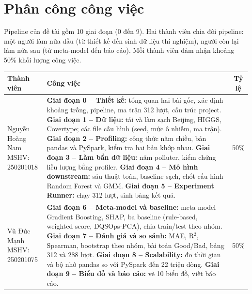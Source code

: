 \section*{Phân công công việc}

Pipeline của đề tài gồm 10 giai đoạn (0 đến 9). Hai thành viên chia đôi pipeline: một người làm nửa đầu (từ thiết kế đến sinh dữ liệu thí nghiệm), người còn lại làm nửa sau (từ meta-model đến báo cáo). Mỗi thành viên đảm nhận khoảng 50\% khối lượng công việc.

\begin{table}[ht]
\centering
\small
\begin{tabularx}{\linewidth}{@{}l>{\raggedright\arraybackslash}Xc@{}}
\toprule
Thành viên & Công việc & Tỷ lệ \\
\midrule
\makecell[l]{Nguyễn Hoàng Nam\\MSHV: 250201018} &
\textbf{Giai đoạn 0 -- Thiết kế:} tổng quan hai bài gốc, xác định khoảng trống, pipeline, ma trận 312 lượt, cấu trúc project.\newline
\textbf{Giai đoạn 1 -- Dữ liệu:} tải và làm sạch Beijing, HIGGS, Covertype; các file cấu hình (seed, mức ô nhiễm, ma trận).\newline
\textbf{Giai đoạn 2 -- Profiling:} công thức năm chiều, bản pandas và PySpark, kiểm tra hai bản khớp nhau.\newline
\textbf{Giai đoạn 3 -- Làm bẩn dữ liệu:} năm polluter, kiểm chứng liều lượng bằng profiler.\newline
\textbf{Giai đoạn 4 -- Mô hình downstream:} sáu thuật toán, baseline sạch, chốt cấu hình Random Forest và GMM.\newline
\textbf{Giai đoạn 5 -- Experiment Runner:} chạy 312 lượt, sinh bảng kết quả. & 50\% \\
\midrule
\makecell[l]{Vũ Đức Mạnh\\MSHV: 250201075} &
\textbf{Giai đoạn 6 -- Meta-model và baseline:} meta-model Gradient Boosting, SHAP, ba baseline (rule-based, weighted score, DQSOps-PCA), chia train/test theo nhóm.\newline
\textbf{Giai đoạn 7 -- Đánh giá và so sánh:} MAE, R$^2$, Spearman, bootstrap theo nhóm, bài toán Good/Bad, bảng 312 và 288 lượt.\newline
\textbf{Giai đoạn 8 -- Scalability:} đo thời gian và bộ nhớ pandas so với PySpark đến 22 triệu dòng.\newline
\textbf{Giai đoạn 9 -- Biểu đồ và báo cáo:} vẽ 10 biểu đồ, viết báo cáo. & 50\% \\
\bottomrule
\end{tabularx}
\end{table}
